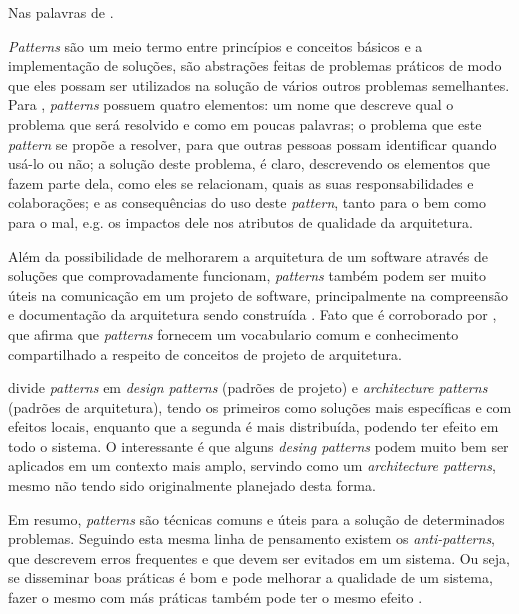 \documentclass[diss]{template/setrem}
\begin{document}
Nas palavras de  .

\emph{Patterns} são um meio termo entre princípios e conceitos básicos e a implementação de soluções, são abstrações feitas de problemas práticos de modo que eles possam ser utilizados na solução de vários outros problemas semelhantes. Para \citet{Gamma1998}, \emph{patterns} possuem quatro elementos: um nome que descreve qual o problema que será resolvido e como em poucas palavras; o problema que este \emph{pattern} se propõe a resolver, para que outras pessoas possam identificar quando usá-lo ou não; a solução deste problema, é claro, descrevendo os elementos que fazem parte dela, como eles se relacionam, quais as suas responsabilidades e colaborações; e as consequências do uso deste \emph{pattern}, tanto para o bem como para o mal, e.g. os impactos dele nos atributos de qualidade da arquitetura.

Além da possibilidade de melhorarem a arquitetura de um software através de soluções que comprovadamente funcionam, \emph{patterns} também podem ser muito úteis na comunicação em um projeto de software, principalmente na compreensão e documentação da arquitetura sendo construída \citep{Vogel2011}. Fato que é corroborado por \citet{Buschmann2007}, que afirma que \emph{patterns} fornecem um vocabulario comum e conhecimento compartilhado a respeito de conceitos de projeto de arquitetura.

\citet{Vogel2011} divide \emph{patterns} em \emph{design patterns} (padrões de projeto) e \emph{architecture patterns} (padrões de arquitetura), tendo os primeiros como soluções mais específicas e com efeitos locais, enquanto que a segunda é mais distribuída, podendo ter efeito em todo o sistema. O interessante é que alguns \emph{desing patterns} podem muito bem ser aplicados em um contexto mais amplo, servindo como um \emph{architecture patterns}, mesmo não tendo sido originalmente planejado desta forma.

Em resumo, \emph{patterns} são técnicas comuns e úteis para a solução de determinados problemas. Seguindo esta mesma linha de pensamento existem os \emph{anti-patterns}, que descrevem erros frequentes e que devem ser evitados em um sistema. Ou seja, se disseminar boas práticas é bom e pode melhorar a qualidade de um sistema, fazer o mesmo com más práticas também pode ter o mesmo efeito \citep{Osmani2011}.
\end{document}
